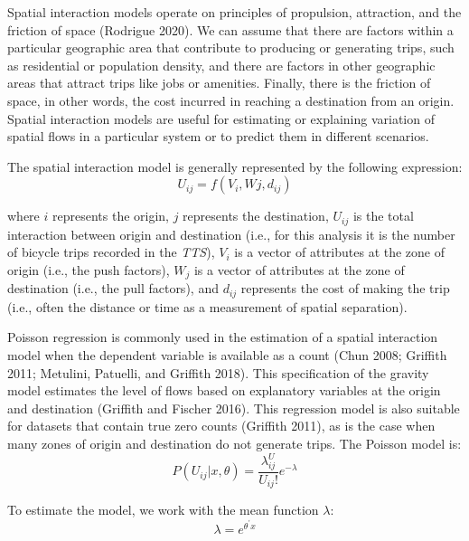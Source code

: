 \documentclass[smallextended]{svjour3}       %
\begin{document}
Spatial interaction models operate on principles of propulsion,
attraction, and the friction of space (Rodrigue 2020). We can assume
that there are factors within a particular geographic area that
contribute to producing or generating trips, such as residential or
population density, and there are factors in other geographic areas that
attract trips like jobs or amenities. Finally, there is the friction of
space, in other words, the cost incurred in reaching a destination from
an origin. Spatial interaction models are useful for estimating or
explaining variation of spatial flows in a particular system or to
predict them in different scenarios.

The spatial interaction model is generally represented by the following
expression: \begin{equation}
\label{eq:interaction-model}
U_{ij} = f(V_i, Wj, d_{ij})
\end{equation}

\noindent where \(i\) represents the origin, \(j\) represents the
destination, \(U_{ij}\) is the total interaction between origin and
destination (i.e., for this analysis it is the number of bicycle trips
recorded in the \emph{TTS}), \(V_i\) is a vector of attributes at the
zone of origin (i.e., the push factors), \(W_j\) is a vector of
attributes at the zone of destination (i.e., the pull factors), and
\(d_{ij}\) represents the cost of making the trip (i.e., often the
distance or time as a measurement of spatial separation).

Poisson regression is commonly used in the estimation of a spatial
interaction model when the dependent variable is available as a count
(Chun 2008; Griffith 2011; Metulini, Patuelli, and Griffith 2018). This
specification of the gravity model estimates the level of flows based on
explanatory variables at the origin and destination (Griffith and
Fischer 2016). This regression model is also suitable for datasets that
contain true zero counts (Griffith 2011), as is the case when many zones
of origin and destination do not generate trips. The Poisson model is:
\begin{equation}
\label{eq:poisson-model}
P(U_{ij}|x,\theta) = \frac{\lambda^U_{ij}}{U_{ij}!}e^{-\lambda} 
\end{equation}

To estimate the model, we work with the mean function \(\lambda\):
\begin{equation}
\label{eq:mean-function}
\lambda = e^{\theta^\prime x} 
\end{equation}
\end{document}

